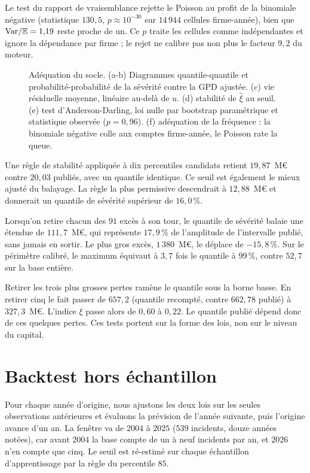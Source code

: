 Le test du rapport de vraisemblance rejette le Poisson au profit de la binomiale négative (statistique $130{,}5$, $p\approx 10^{-30}$ sur $14\,944$ cellules firme-année), bien que $\mathrm{Var}/\mathbb{E}=1{,}19$ reste proche de un. Ce $p$ traite les cellules comme indépendantes et ignore la dépendance par firme ; le rejet ne calibre pas non plus le facteur $9{,}2$ du moteur.

\begin{figure}[H]\centering
{}
\caption{Adéquation du socle. (a-b) Diagrammes quantile-quantile et probabilité-probabilité de la sévérité
contre la GPD ajustée. (c) vie résiduelle moyenne, linéaire au-delà de $u$. (d) stabilité
de $\hat\xi$ au seuil. (e) test d'Anderson-Darling, loi nulle par bootstrap
paramétrique et statistique observée ($p=0{,}96$). (f) adéquation de la fréquence :
la binomiale négative colle aux comptes firme-année, le Poisson rate la queue.}
\label{soc:fig:validation}
\end{figure}

Une règle de stabilité appliquée à dix percentiles candidats retient $19{,}87$~M\euro{} contre
$20{,}03$ publiés, avec un quantile identique. Ce seuil est également le mieux ajusté du balayage.
La règle la plus permissive descendrait à $12{,}88$~M\euro{} et donnerait un quantile de sévérité
supérieur de $16{,}0\,\%$.

Lorsqu'on retire chacun des $91$ excès à son tour, le quantile de sévérité balaie une étendue de
$111{,}7$~M\euro, qui représente $17{,}9\,\%$ de l'amplitude de l'intervalle publié, sans jamais en
sortir. Le plus gros excès, $1\,380$~M\euro, le déplace de $-15{,}8\,\%$. Sur le périmètre
calibré, le maximum équivaut à $3{,}7$ fois le quantile à $99\,\%$, contre $52{,}7$ sur la base
entière.

Retirer les trois plus grosses pertes ramène le quantile sous la borne basse.
En retirer cinq le fait passer de $657{,}2$ (quantile recompté, contre $662{,}78$ publié) à $327{,}3$~M\euro.
L'indice $\xi$ passe alors de $0{,}60$ à $0{,}22$.
Le quantile publié dépend donc de ces quelques pertes. Ces tests portent sur la forme des lois, non sur le niveau du capital.

\section{Backtest hors échantillon}
\label{soc:sec:backtest}

Pour chaque année d'origine, nous ajustons les deux lois sur les seules observations antérieures et
évaluons la prévision de l'année suivante, puis l'origine avance d'un an. La fenêtre va de $2004$ à $2025$
($539$ incidents, douze années notées), car avant $2004$ la base compte de un à neuf incidents par
an, et $2026$ n'en compte que cinq. Le seuil est ré-estimé sur chaque échantillon d'apprentissage
par la règle du percentile $85$.

